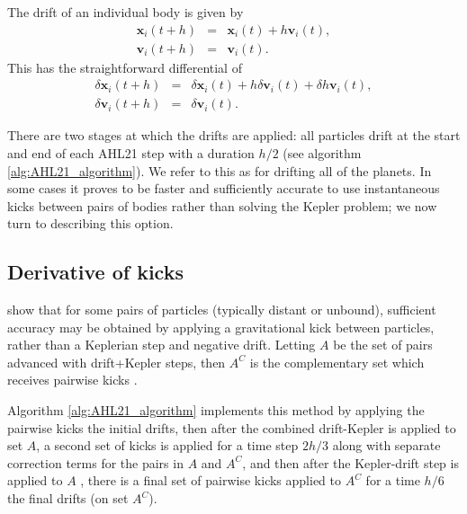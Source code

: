 \documentclass[fleqn,usenatbib,twocolumn]{mnras}
\newcommand   {\change}[1] {{\color{black}{#1}}}
\begin{document}
The drift of an individual body is given by
\begin{eqnarray}
    \mathbf{x}_i(t+h) &=& \mathbf{x}_i(t) + h \mathbf{v}_i(t),\\
    \mathbf{v}_i(t+h) &=& \mathbf{v}_i(t).
\end{eqnarray}
This has the straightforward differential of
\begin{eqnarray}
    \delta \mathbf{x}_i(t+h) &=& \delta \mathbf{x}_i(t) + h \delta \mathbf{v}_i(t) + \delta h \mathbf{v}_i(t),\\
    \delta \mathbf{v}_i(t+h) &=& \delta \mathbf{v}_i(t).
\end{eqnarray}

There are two stages at which the drifts are applied: all particles drift
at the start and end of each {\sc AHL21} step with a duration $h/2$ (see algorithm
\ref{alg:AHL21_algorithm}). We refer to this as \change{$\mathbf{I}+\Delta\mathbf{J}_\mathrm{D}(h)$} for
drifting all of the planets.  In some cases it proves to be faster and sufficiently accurate to use instantaneous kicks between pairs of bodies rather than solving the Kepler problem;  we now turn to describing this option.

\subsection{Derivative of kicks} \label{sec:kicks}

\citet{Hernandez2015} show that for some pairs of particles (typically distant
or unbound), sufficient accuracy may be obtained by applying a gravitational
kick between particles, rather than a Keplerian step and negative drift.  Letting $A$ be the set of pairs \change{$(i,j)$} advanced with drift+Kepler steps, then  $A^C$ is the complementary set which receives pairwise kicks \change{such that $A \cap A^C = \varnothing$}.  \change{Note that if all pairs are in $A^C$, the integrator becomes leapfrog.}

Algorithm \ref{alg:AHL21_algorithm}
implements this method by applying the pairwise kicks \change{(to set $A^C$) for a time step $h/6$ before} the initial drifts,
then after the combined drift-Kepler is applied to set $A$, a second set of kicks is applied for a time step $2h/3$ along with separate correction terms for the pairs in $A$ and $A^C$, and then after the \change{second } Kepler-drift step is applied to $A$ \change{in reverse order}, there is a final set of pairwise kicks applied to $A^C$ for a time $h/6$ \change{after} the final drifts (on set $A^C$).
\end{document}
